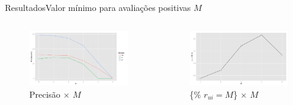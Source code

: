 \begin{frame}{Resultados}{Valor mínimo para avaliações positivas $M$}
\begin{columns}[b]
\begin{figure}[ht]
    \begin{center}
    \includegraphics[width=1.1\textwidth]{../img/precision_M}
    \end{center}
    \caption{Precisão $\times$ $M$}
    \label{fig:precision_M}
\end{figure}


\begin{figure}[ht]
    \begin{center}
    \includegraphics[width=1.1\textwidth]{../img/percentual_M}
    \end{center}
    \caption{\{\% $r_{ui} = M$\} $\times$ $M$}
    \label{fig:percentual_M}
\end{figure}
\end{columns}
\end{frame}

